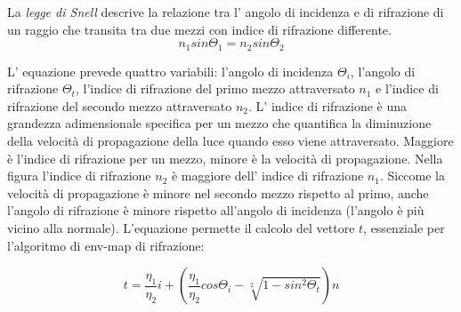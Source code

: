 La \emph{legge di Snell} descrive la relazione tra l’ angolo di incidenza e di rifrazione di un raggio che transita tra due mezzi con indice di rifrazione differente.
\begin{equation}
n_1sin\Theta_1 = n_2sin\Theta_2 
\end{equation}

L’ equazione prevede quattro variabili: l’angolo di incidenza $\Theta_i$, l’angolo di rifrazione $\Theta_t$, l’indice di rifrazione del primo mezzo attraversato $n_1$ e l’indice di rifrazione del secondo mezzo attraversato $n_2$.
L’ indice di rifrazione è una grandezza adimensionale specifica per un mezzo che quantifica la diminuzione della velocità di propagazione della luce quando esso viene attraversato. Maggiore è l’indice di rifrazione per un mezzo, minore è la velocità di propagazione.
Nella figura l’indice di rifrazione $n_2$ è maggiore dell’ indice di rifrazione $n_1$. 
Siccome la velocità di propagazione è minore nel secondo mezzo rispetto al primo, anche l’angolo di rifrazione è minore rispetto all’angolo di incidenza (l’angolo è più vicino alla normale). 
L’equazione permette il calcolo del vettore $t$, essenziale per l’algoritmo di env-map di rifrazione:

\begin{equation}
t = \frac{\eta_1}{\eta_2}i + (\frac{\eta_1}{\eta_2}cos\Theta_i - \sqrt[2]{1 - sin^2\Theta_t})n
\end{equation}


